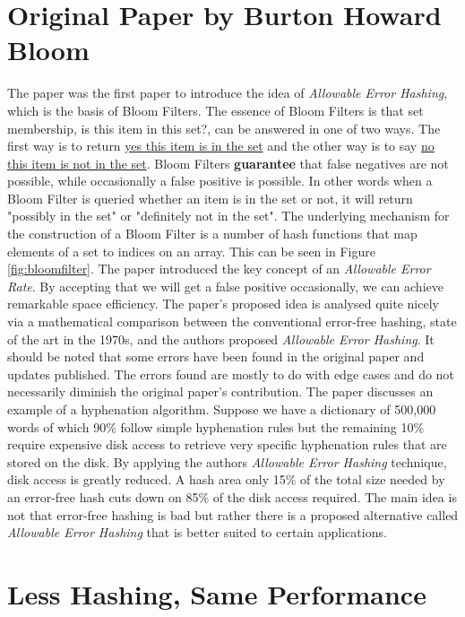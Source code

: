 \documentclass[MScCS]{uccthesis}
\begin{document}
\section{Original Paper by Burton Howard Bloom}
The paper was the first paper to introduce the idea of \textit{Allowable Error Hashing}, which is the basis of Bloom Filters. The essence of Bloom Filters is that set membership, is this item in this set?, can be answered in one of two ways. The first way is to return \underline{yes this item is in the set} and the other way is to say \underline{no this item is not in the set}. Bloom Filters \textbf{guarantee} that false negatives are not possible, while occasionally a false positive is possible. In other words when a Bloom Filter is queried whether an item is in the set or not, it will return "possibly in the set" or "definitely not in the set". The underlying mechanism for the construction of a Bloom Filter is a number of hash functions that map elements of a set to indices on an array. This can be seen in Figure \ref{fig:bloomfilter}. The paper introduced the key concept of an \textit{Allowable Error Rate}. By accepting that we will get a false positive occasionally, we can achieve remarkable space efficiency. The paper's proposed idea is analysed quite nicely via a mathematical comparison between the conventional error-free hashing, state of the art in the 1970s, and the authors proposed \textit{Allowable Error Hashing}. It should be noted that some errors have been found in the original paper and updates published\cite{bose2008false}. The errors found are mostly to do with edge cases and do not necessarily diminish the original paper's contribution. The paper discusses an example of a hyphenation algorithm. Suppose we have a dictionary of 500,000 words of which 90\% follow simple hyphenation rules but the remaining 10\% require expensive disk access to retrieve very specific hyphenation rules that are stored on the disk. By applying the authors \textit{Allowable Error Hashing} technique, disk access is greatly reduced. A hash area only 15\% of the total size needed by an error-free hash cuts down on 85\% of the disk access required. The main idea is not that error-free hashing is bad but rather there is a proposed alternative called \textit{Allowable Error Hashing} that is better suited to certain applications.

\section{Less Hashing, Same Performance}


%
%
\backmatter
%
%
\printbibliography
\end{document}
